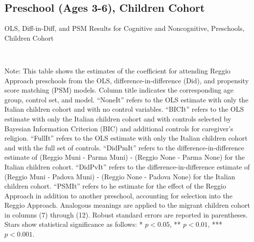 

\begin{landscape}
\subsection{Preschool (Ages 3-6), Children Cohort}

\begin{table}[H] \caption{OLS, Diff-in-Diff, and PSM Results for Cognitive and Noncognitive, Preschools, Children Cohort} \label{ols-E-reg}
\scalebox{0.80}{}
\vspace{1ex} \\
\footnotesize\raggedright{Note: This table shows the estimates of the coefficient for attending Reggio Approach preschools from the OLS, difference-in-difference (Did), and propensity score matching (PSM) models. Column title indicates the corresponding age group, control set, and model. ``NoneIt'' refers to the OLS estimate with only the Italian children cohort and with no control variables. ``BICIt'' refers to the OLS estimate with only the Italian children cohort and with controls selected by Bayesian Information Criterion (BIC) and additional controls for caregiver's religion. ``FullIt'' refers to the OLS estimate with only the Italian children cohort and with the full set of controls. ``DidPmIt'' refers to the difference-in-difference estimate of (Reggio Muni - Parma Muni) - (Reggio None - Parma None) for the Italian children cohort. ``DidPvIt'' refers to the difference-in-difference estimate of (Reggio Muni - Padova Muni) - (Reggio None - Padova None) for the Italian children cohort. ``PSMIt'' refers to he estimate for the effect of the Reggio Approach in addition to another preschool, accounting for selection into the Reggio Approach. Analogous meanings are applied to the migrant children cohort in columns (7) through (12). Robust standard errors are reported in parentheses. Stars show statistical significance as follows: * $p < 0.05$, ** $p < 0.01$, *** $p < 0.001$.}
\end{table}


\end{landscape}
